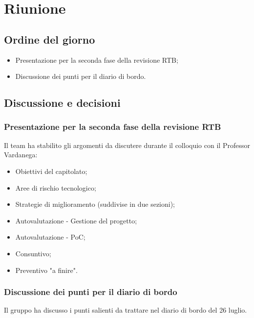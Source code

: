 \section{Riunione}
\subsection{Ordine del giorno}
\begin{itemize}
	\item Presentazione per la seconda fase della revisione RTB;
	\item Discussione dei punti per il diario di bordo.
\end{itemize}

\subsection{Discussione e decisioni}
\subsubsection{Presentazione per la seconda fase della revisione RTB}
\par Il team ha stabilito gli argomenti da discutere durante il colloquio con il Professor Vardanega:
\begin{itemize}
	\item Obiettivi del capitolato;
	\item Aree di rischio tecnologico;
	\item Strategie di miglioramento (suddivise in due sezioni);
	\item Autovalutazione - Gestione del progetto;
	\item Autovalutazione - PoC;
	\item Consuntivo;
	\item Preventivo "a finire".
\end{itemize}

\subsubsection{Discussione dei punti per il diario di bordo}
\par Il gruppo ha discusso i punti salienti da trattare nel diario di bordo del 26 luglio.
